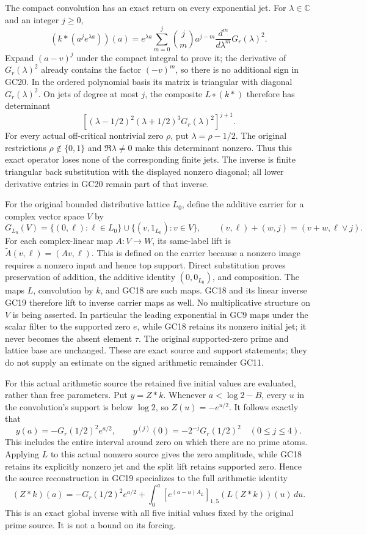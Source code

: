 The compact convolution has an exact return on every exponential
jet. For \(\lambda\in\mathbb C\) and an integer \(j\ge0\),
\[
 (k*(a^je^{\lambda a}))(a)
 =e^{\lambda a}\sum_{m=0}^j\binom jm a^{j-m}
                  \frac{d^m}{d\lambda^m}G_r(\lambda)^2.
 \tag{GC20}
\]
Expand \((a-v)^j\) under the compact integral to prove it;
the derivative of \(G_r(\lambda)^2\) already contains the factor
\((-v)^m\), so there is no additional sign in GC20.
In the ordered polynomial basis its matrix is triangular with
diagonal \(G_r(\lambda)^2\). On jets of degree at most \(j\),
the composite \(L\circ(k*)\) therefore has determinant
\[
 \left[(\lambda-1/2)^2(\lambda+1/2)^3G_r(\lambda)^2\right]^{j+1}.
 \tag{GC21}
\]
For every actual off-critical nontrivial zero \(\rho\), put
\(\lambda=\rho-1/2\). The original restrictions
\(\rho\notin\{0,1\}\) and \(\Re\lambda\ne0\) make this determinant
nonzero. Thus this exact operator loses none of the corresponding
finite jets. The inverse is finite triangular back substitution
with the displayed nonzero diagonal; all lower derivative entries
in GC20 remain part of that inverse.

For the original bounded distributive lattice \(L_0\), define the
additive carrier for a complex vector space \(V\) by
\[
 G_{L_0}(V)=\{(0,\ell):\ell\in L_0\}
       \cup\{(v,1_{L_0}):v\in V\},\qquad
 (v,\ell)+(w,j)=(v+w,\ell\vee j).
\]
For each complex-linear map \(A:V\to W\), its same-label lift is
\(\widetilde A(v,\ell)=(Av,\ell)\). This is defined on the
carrier because a nonzero image requires a nonzero input and hence
top support. Direct substitution proves preservation of addition,
the additive identity \((0,0_{L_0})\), and composition.
The maps \(L\), convolution by \(k\), and GC18 are such maps.
GC18 and its linear inverse GC19 therefore lift to inverse carrier
maps as well. No multiplicative structure on \(V\) is being asserted.
In
particular the leading exponential in GC9 maps under the scalar
filter to the supported zero \(e\), while GC18 retains its
nonzero initial jet; it never becomes the absent element \(\tau\).
The original supported-zero prime and lattice base are unchanged.
These are exact source and support statements; they do not supply
an estimate on the signed arithmetic remainder GC11.

For this actual arithmetic source the retained five initial values
are evaluated, rather than free parameters. Put \(y=Z*k\).
Whenever \(a<\log2-B\), every \(u\) in the convolution's support
is below \(\log2\), so \(Z(u)=-e^{u/2}\). It follows exactly that
\[
 y(a)=-G_r(1/2)^2e^{a/2},\qquad
 y^{(j)}(0)=-2^{-j}G_r(1/2)^2\quad(0\le j\le4).
 \tag{GC22}
\]
This includes the entire interval around zero on which there are no
prime atoms. Applying \(L\) to this actual nonzero source gives the
zero amplitude, while GC18 retains its explicitly nonzero jet and
the split lift retains supported zero. Hence the source reconstruction
in GC19 specializes to the full arithmetic identity
\[
 (Z*k)(a)=-G_r(1/2)^2e^{a/2}
       +\int_0^a[e^{(a-u)A_L}]_{1,5}(L(Z*k))(u)\,du.
 \tag{GC23}
\]
This is an exact global inverse with all five initial values fixed by
the original prime source. It is not a bound on its forcing.

